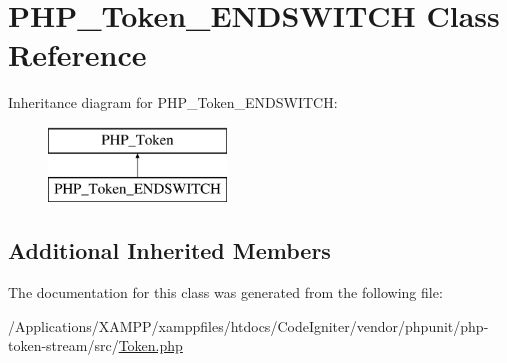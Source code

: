 \hypertarget{class_p_h_p___token___e_n_d_s_w_i_t_c_h}{}\section{P\+H\+P\+\_\+\+Token\+\_\+\+E\+N\+D\+S\+W\+I\+T\+CH Class Reference}
\label{class_p_h_p___token___e_n_d_s_w_i_t_c_h}
Inheritance diagram for P\+H\+P\+\_\+\+Token\+\_\+\+E\+N\+D\+S\+W\+I\+T\+CH\+:\begin{figure}[H]
\begin{center}
\leavevmode
\includegraphics[height=2.000000cm]{class_p_h_p___token___e_n_d_s_w_i_t_c_h}
\end{center}
\end{figure}
\subsection*{Additional Inherited Members}


The documentation for this class was generated from the following file\+:\begin{DoxyCompactItemize}
\item 
/\+Applications/\+X\+A\+M\+P\+P/xamppfiles/htdocs/\+Code\+Igniter/vendor/phpunit/php-\/token-\/stream/src/\mbox{\hyperlink{_token_8php}{Token.\+php}}\end{DoxyCompactItemize}
